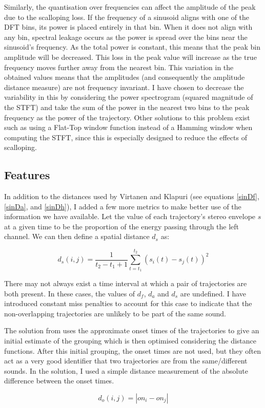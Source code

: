 \documentclass[12pt,a4paper,twoside,openright]{report}
\begin{document}
Similarly, the quantisation over frequencies can affect the amplitude of the peak due to the scalloping loss. If the frequency of a sinusoid aligns with one of the DFT bins, its power is placed entirely in that bin. When it does not align with any bin, spectral leakage occurs as the power is spread over the bins near the sinusoid's frequency. As the total power is constant, this means that the peak bin amplitude will be decreased. This loss in the peak value will increase as the true frequency moves further away from the nearest bin. This variation in the obtained values means that the amplitudes (and consequently the amplitude distance measure) are not frequency invariant. I have chosen to decrease the variability in this by considering the power spectrogram (squared magnitude of the STFT) and take the sum of the power in the nearest two bins to the peak frequency as the power of the trajectory. Other solutions to this problem exist such as using a Flat-Top window function instead of a Hamming window when computing the STFT, since this is especially designed to reduce the effects of scalloping.

{\color{red}\subsection{Features}

In addition to the distances used by Virtanen and Klapuri (see equations \ref{sinDf}, \ref{sinDa}, and \ref{sinDh}), I added a few more metrics to make better use of the information we have available. Let the value of each trajectory's stereo envelope $ s $ at a given time to be the proportion of the energy passing through the left channel. We can then define a spatial distance $ d_s $ as:

\begin{equation}
d_s(i,j) = \frac{1}{t_2 - t_1 + 1} \sum_{t = t_1}^{t_2} \left( s_i(t) - s_j(t) \right)^2
\end{equation}

There may not always exist a time interval at which a pair of trajectories are both present. In these cases, the values of $ d_f $, $ d_a $ and $ d_s $ are undefined. I have introduced constant miss penalties to account for this case to indicate that the non-overlapping trajectories are unlikely to be part of the same sound.

The solution from \cite{virtanen2000separation} uses the approximate onset times of the trajectories to give an initial estimate of the grouping which is then optimised considering the distance functions. After this initial grouping, the onset times are not used, but they often act as a very good identifier that two trajectories are from the same/different sounds. In the solution, I used a simple distance measurement of the absolute difference between the onset times.

\begin{equation}
d_o(i,j) = \left| \mathit{on}_i - \mathit{on}_j \right|
\end{equation}}
\end{document}
